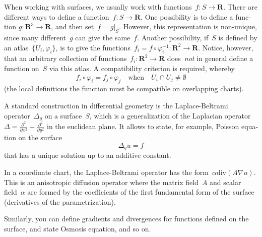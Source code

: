 \documentclass{article}
\def\R{\mathbf{R}} %
\begin{document}
\begin{otherlanguage}{british}
When working with surfaces, we usually work with functions~$f:S\to\R$.
There are different ways to define a function~$f:S\to\R$.  One possibility is
to define a function $g:\R^3\to\R$, and then set~$f=g|_S$.  However, this
representation is non-unique, since many different~$g$ can give the same~$f$.
Another possibility, if~$S$ is defined by an atlas~$\{U_i,\varphi_i\}$, is to
give the functions~$f_i=f\circ\varphi_i^{-1}:\R^2\to\R$.
Notice, however, that an arbitrary collection of functions~$f_i:\R^2\to\R$
does~\emph{not} in general define a function on~$S$ via this atlas.  A
compatibility criterion is required, whereby
\begin{equation}\label{eq:compat}
f_i\circ\varphi_i=f_j\circ\varphi_j\quad\textrm{when}\quad U_i\cap U_j\neq\emptyset
\end{equation}
		(the
local definitions the function must be compatible on overlapping charts).

A standard construction in differential geometry is the Laplace-Beltrami
operator~$\Delta_g$ on a surface~$S$, which is a generalization of the Laplacian
operator~$\Delta=\frac{\partial^2}{\partial x^2}+\frac{\partial^2}{\partial
y^2}$ in the euclidean plane.  It allows to state, for example, Poisson
equation on the surface
\[
	\Delta_g u = f
\]
that has a unique solution up to an additive constant.

In a coordinate chart, the Laplace-Beltrami operator has the
form~$\alpha\mathrm{div}\left(A\nabla u\right)$.  This is an anisotropic
diffusion operator where the matrix field~$A$ and scalar field~$\alpha$ are
formed by the coefficients of the first fundamental form of the surface
(derivatives of the parametrization).

Similarly, you can define gradients and divergences for functions defined on
the surface, and state Osmosis equation, and so on.



\end{otherlanguage}
\end{document}
